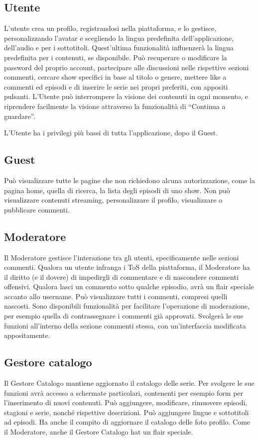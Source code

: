 \documentclass[11pt,a4paper]{article}
\begin{document}
\subsection{Utente}
L’utente crea un profilo, registrandosi nella piattaforma, e lo gestisce, personalizzando l’avatar e scegliendo la lingua predefinita dell’applicazione, dell’audio e per i sottotitoli. Quest’ultima funzionalità influenzerà la lingua predefinita per i contenuti, se disponibile. Può recuperare o modificare la password del proprio account, partecipare alle discussioni nelle rispettive sezioni commenti, cercare show specifici in base al titolo o genere, mettere like a commenti ed episodi e di inserire le serie nei propri preferiti, con appositi pulsanti. L'Utente può interrompere la visione dei contenuti in ogni momento, e riprendere facilmente la visione attraverso la funzionalità di ``Continua a guardare''. 

L'Utente ha i privilegi più bassi di tutta l'applicazione, dopo il Guest. 

\subsection{Guest}
Può visualizzare tutte le pagine che non richiedono alcuna autorizzazione, come la pagina home, quella di ricerca, la lista degli episodi di uno show. Non può visualizzare contenuti streaming, personalizzare il profilo, visualizzare o pubblicare commenti.

\subsection{Moderatore}
Il Moderatore gestisce l'interazione tra gli utenti, specificamente nelle sezioni commenti. Qualora un utente infranga i ToS della piattaforma, il Moderatore ha il diritto (e il dovere) di impedirgli di commentare e di nascondere commenti offensivi. Qualora lasci un commento sotto qualche episodio, avrà un flair speciale accanto allo username. Può visualizzare tutti i commenti, compresi quelli nascosti. Sono disponibili funzionalità per facilitare l'operazione di moderazione, per esempio quella di contrassegnare i commenti già approvati. Svolgerà le sue funzioni all'interno della sezione commenti stessa, con un’interfaccia modificata appositamente.

\subsection{Gestore catalogo}
Il Gestore Catalogo mantiene aggiornato il catalogo delle serie. Per svolgere le sue funzioni avrà accesso a schermate particolari, contenenti per esempio form per l'inserimento di nuovi contenuti. Può aggiungere, modificare, rimuovere episodi, stagioni e serie, nonché rispettive descrizioni. Può aggiungere lingue e sottotitoli ad episodi. Ha anche il compito di aggiornare il catalogo delle foto profilo. Come il Moderatore, anche il Gestore Catalogo hat un flair speciale.
\end{document}

